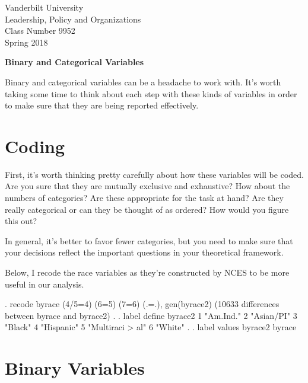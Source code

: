 \documentclass[12 pt]{article}
\begin{document}
\thispagestyle{empty}%


\setlength{\parskip}{1ex plus 0.5ex minus 0.2ex}

\setcounter{secnumdepth}{-2}



\begin{flushleft}
Vanderbilt University\\Leadership, Policy and Organizations\\Class Number 9952\\ Spring 2018
\end{flushleft}

\begin{center}
\textbf{Binary and Categorical Variables}
\end{center}


Binary and categorical variables can be a headache to work with. It's worth taking some time to think about each step 
with these kinds of variables in order to make sure that they are being reported effectively. 

\section{Coding}

First, it's worth thinking pretty carefully about how these variables
will be coded. Are you sure that they are mutually exclusive and
exhaustive? How about the numbers of categories? Are these appropriate
for the task at hand? Are they really categorical or can they be
thought of as ordered? How would you figure this out? 

In general, it's better to favor fewer categories, but you need to
make sure that your decisions reflect the important questions in your
theoretical framework. 

Below, I recode the race variables as they're constructed by NCES to
be more useful in our analysis. 

\begin{stlog}

. recode byrace (4/5=4) (6=5) (7=6) (.=.), gen(byrace2)
(10633 differences between byrace and byrace2)
. 
. label define byrace2 1 "Am.Ind." 2 "Asian/PI" 3 "Black" 4 "Hispanic" 5 "Multiraci
> al" 6 "White"
. 
. label values byrace2 byrace  
\end{stlog}

\section{Binary Variables}
\end{document}
